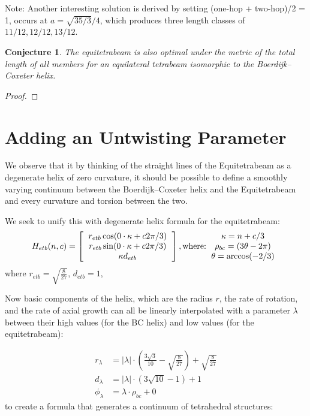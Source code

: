 \documentclass[11pt]{article}
\newtheorem{conjecture}{Conjecture}
\begin{document}
Note: Another interesting solution is derived by setting (one-hop + two-hop)/2 = 1,  occurs at $a = \sqrt{35/3}/4$,
which produces three length classes of $11/12, 12/12, 13/12$.

\begin{conjecture}
  The equitetrabeam is also optimal under the metric of the total length of all members 
  for an equilateral tetrabeam isomorphic to the Boerdijk--Coxeter helix.
\end{conjecture}

\begin{proof}
  
\end{proof}


\section{Adding an Untwisting Parameter}

We observe that it by thinking of the straight lines of the Equitetrabeam as a degenerate helix of zero curvature,
it should be possible to define a smoothly varying continuum between the Boerdijk--Coxeter helix and the Equitetrabeam and every
curvature and torsion between the two.

We seek to unify this with degenerate helix formula for the equitetrabeam:
\[
H_{etb}(n,c) =
\left [
  \begin{tabular}{c}
   $ r_{etb}  \cos( 0 \cdot \kappa  + c 2 \pi /3) $\\
   $ r_{etb}  \sin( 0 \cdot \kappa  + c 2 \pi /3) $\\
   $ \kappa d_{etb} $
  \end{tabular}
\right ],
\text{where:}
  \begin{tabular}{c}
 $\kappa = n + c/3$ \\
    $\rho_{bc} = (3 \theta - 2 \pi)$ \\
   $ \theta = \arccos(-2/3) $
  \end{tabular}      
\]
where $ r_{etb} = \sqrt{\frac{8}{27}}$, $d_{etb} = 1$,

Now basic components of the helix, which are the radius $r$, the rate of rotation, and the rate of
axial growth can all be linearly interpolated with a parameter $\lambda$ between their high values (for the BC helix)
and low values (for the equitetrabeam):

\begin{align*}
r_{\lambda}  &=  \lvert \lambda \rvert \cdot (\frac{3 \sqrt{3}}{10}  - \sqrt{\frac{8}{27}}) + \sqrt{\frac{8}{27}}  \\
d_{\lambda} &=   \lvert \lambda \rvert \cdot (3 \sqrt{10} - 1) + 1 \\
\phi_{\lambda} &=  \lambda \cdot \rho_{bc}  + 0
\end{align*}
to create a formula that generates a continuum of tetrahedral structures:
\end{document}
